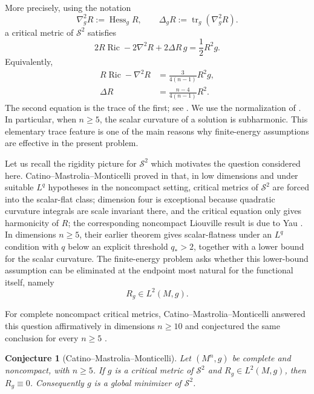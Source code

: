 \documentclass[11pt]{amsart}
\numberwithin{equation}{section}
\newtheorem{conjecture}{Conjecture}[section]
\DeclareMathOperator{\Ric}{Ric}
\newcommand{\Hess}{\nabla^2}
\begin{document}
More precisely, 
using the notation
$$
      \nabla_g^2 R := \operatorname{Hess}_g R,
        \qquad
        \Delta_g R:=\operatorname{tr}_g(\nabla_g^2 R).
$$
a critical metric of $\mathcal S^2$ satisfies
\begin{equation}\label{EL0intro}
        2R\Ric-2\Hess R+2\Delta R\,g=\frac12R^2g .
\end{equation}
Equivalently,
\begin{align}
        R\Ric - \Hess R &= \frac{3}{4(n-1)} R^2 g, \label{EL1}\\
        \Delta R &= \frac{n-4}{4(n-1)}R^2 . \label{EL2}
\end{align}
The second equation is the trace of the first; see \cite[Proposition~4.66]{Besse}.  We use the normalization of \cite[(1.1)--(1.2)]{CMM2026}.  In particular, when $n\ge5$, the scalar curvature of a solution is subharmonic.  This elementary trace feature is one of the main reasons why finite-energy assumptions are effective in the present problem.

Let us recall the rigidity picture for $\mathcal S^2$ which motivates the question considered here.  Catino--Mastrolia--Monticelli proved in \cite{CMM2023} that, in low dimensions and under suitable $L^q$ hypotheses in the noncompact setting, critical metrics of $\mathcal S^2$ are forced into the scalar-flat class; dimension four is exceptional because quadratic curvature integrals are scale invariant there, and the critical equation only gives harmonicity of $R$; the corresponding noncompact Liouville result is due to Yau \cite{Yau1976}.  In dimensions $n\ge5$, their earlier theorem gives scalar-flatness under an $L^q$ condition with $q$ below an explicit threshold $q_*>2$, together with a lower bound for the scalar curvature.  The finite-energy problem asks whether this lower-bound assumption can be eliminated at the endpoint most natural for the functional itself, namely
$$
        R_g\in L^2(M,g).
$$

For complete noncompact critical metrics, Catino--Mastrolia--Monticelli answered this question affirmatively in dimensions $n\ge10$ and conjectured the same conclusion for every $n\ge5$ \cite[Theorem~1.1 and Conjecture~1.2]{CMM2026}.

\begin{conjecture}[Catino--Mastrolia--Monticelli]\label{conj}
Let $(M^n,g)$ be complete and noncompact, with $n\ge5$.  If $g$ is a critical metric of $\mathcal S^2$ and $R_g\in L^2(M,g)$, then $R_g\equiv0$.  Consequently $g$ is a global minimizer of $\mathcal S^2$.
\end{conjecture}
\end{document}

